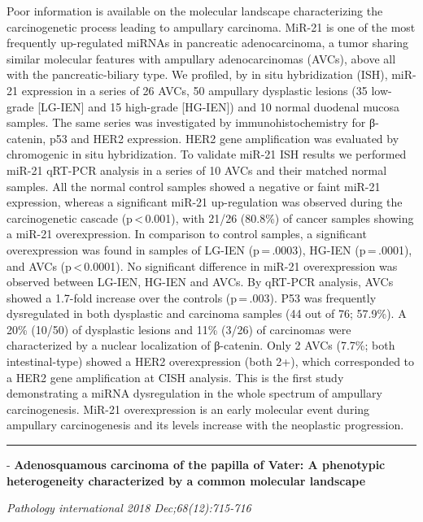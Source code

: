 \documentclass[]{article}
\begin{document}
Poor information is available on the molecular landscape characterizing
the carcinogenetic process leading to ampullary carcinoma. MiR-21 is one
of the most frequently up-regulated miRNAs in pancreatic adenocarcinoma,
a tumor sharing similar molecular features with ampullary
adenocarcinomas (AVCs), above all with the pancreatic-biliary type. We
profiled, by in situ hybridization (ISH), miR-21 expression in a series
of 26 AVCs, 50 ampullary dysplastic lesions (35 low-grade {[}LG-IEN{]}
and 15 high-grade {[}HG-IEN{]}) and 10 normal duodenal mucosa samples.
The same series was investigated by immunohistochemistry for β-catenin,
p53 and HER2 expression. HER2 gene amplification was evaluated by
chromogenic in situ hybridization. To validate miR-21 ISH results we
performed miR-21 qRT-PCR analysis in a series of 10 AVCs and their
matched normal samples. All the normal control samples showed a negative
or faint miR-21 expression, whereas a significant miR-21 up-regulation
was observed during the carcinogenetic cascade (p\,\textless{}\,0.001),
with 21/26 (80.8\%) of cancer samples showing a miR-21 overexpression.
In comparison to control samples, a significant overexpression was found
in samples of LG-IEN (p\,=\,.0003), HG-IEN (p\,=\,.0001), and AVCs
(p\,\textless{}\,0.0001). No significant difference in miR-21
overexpression was observed between LG-IEN, HG-IEN and AVCs. By qRT-PCR
analysis, AVCs showed a 1.7-fold increase over the controls
(p\,=\,.003). P53 was frequently dysregulated in both dysplastic and
carcinoma samples (44 out of 76; 57.9\%). A 20\% (10/50) of dysplastic
lesions and 11\% (3/26) of carcinomas were characterized by a nuclear
localization of β-catenin. Only 2 AVCs (7.7\%; both intestinal-type)
showed a HER2 overexpression (both 2+), which corresponded to a HER2
gene amplification at CISH analysis. This is the first study
demonstrating a miRNA dysregulation in the whole spectrum of ampullary
carcinogenesis. MiR-21 overexpression is an early molecular event during
ampullary carcinogenesis and its levels increase with the neoplastic
progression.

{}

{}

\begin{center}\rule{0.5\linewidth}{\linethickness}\end{center}

 - \textbf{Adenosquamous carcinoma of the papilla of Vater: A phenotypic
heterogeneity characterized by a common molecular landscape}

\emph{Pathology international 2018 Dec;68(12):715-716}
\end{document}
